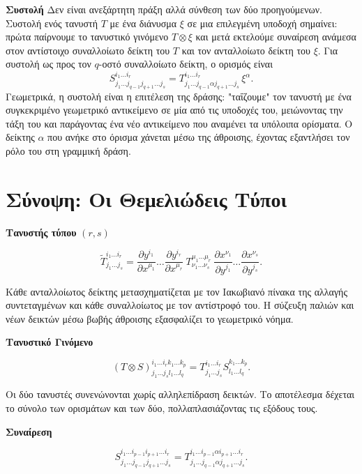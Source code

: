 \documentclass[12pt]{article}
\begin{document}
\textbf{Συστολή}  
Δεν είναι ανεξάρτητη πράξη αλλά σύνθεση των δύο προηγούμενων. Συστολή ενός τανυστή \( T \) με ένα διάνυσμα \( \xi \) σε μια επιλεγμένη υποδοχή σημαίνει: πρώτα παίρνουμε το τανυστικό γινόμενο \( T \otimes \xi \) και μετά εκτελούμε συναίρεση ανάμεσα στον αντίστοιχο συναλλοίωτο δείκτη του \( T \) και τον ανταλλοίωτο δείκτη του \( \xi \). Για συστολή ως προς τον \( q \)-οστό συναλλοίωτο δείκτη, ο ορισμός είναι
\[
S^{i_1 \dots i_r}_{j_1 \dots j_{q-1} j_{q+1} \dots j_s} = T^{i_1 \dots i_r}_{j_1 \dots j_{q-1} \alpha j_{q+1} \dots j_s} \, \xi^\alpha. \tag{13}
\]
Γεωμετρικά, η συστολή είναι η επιτέλεση της δράσης: "ταΐζουμε" τον τανυστή με ένα συγκεκριμένο γεωμετρικό αντικείμενο σε μία από τις υποδοχές του, μειώνοντας την τάξη του και παράγοντας ένα νέο αντικείμενο που αναμένει τα υπόλοιπα ορίσματα. Ο δείκτης \( \alpha \) που ανήκε στο όρισμα χάνεται μέσω της άθροισης, έχοντας εξαντλήσει τον ρόλο του στη γραμμική δράση.

\section{Σύνοψη: Οι Θεμελιώδεις Τύποι}

\textbf{Τανυστής τύπου} \( (r, s) \)

\[
\tilde{T}^{i_1 \dots i_r}_{j_1 \dots j_s} = \frac{\partial y^{i_1}}{\partial x^{\mu_1}} \dots \frac{\partial y^{i_r}}{\partial x^{\mu_r}} \ T^{\mu_1 \dots \mu_r}_{\nu_1 \dots \nu_s} \ \frac{\partial x^{\nu_1}}{\partial y^{j_1}} \dots \frac{\partial x^{\nu_s}}{\partial y^{j_s}}. \tag{10}
\]

Κάθε ανταλλοίωτος δείκτης μετασχηματίζεται με τον Ιακωβιανό πίνακα της αλλαγής συντεταγμένων και κάθε συναλλοίωτος με τον αντίστροφό του. Η σύζευξη παλιών και νέων δεικτών μέσω βωβής άθροισης εξασφαλίζει το γεωμετρικό νόημα.

\textbf{Τανυστικό Γινόμενο}

\[
(T \otimes S)^{i_1 \dots i_r k_1 \dots k_p}_{j_1 \dots j_s l_1 \dots l_q} = T^{i_1 \dots i_r}_{j_1 \dots j_s} S^{k_1 \dots k_p}_{l_1 \dots l_q}. \tag{11}
\]

Οι δύο τανυστές συνενώνονται χωρίς αλληλεπίδραση δεικτών. Το αποτέλεσμα δέχεται το σύνολο των ορισμάτων και των δύο, πολλαπλασιάζοντας τις εξόδους τους.

\textbf{Συναίρεση}

\[
S^{i_1 \dots i_{p-1} i_{p+1} \dots i_r}_{j_1 \dots j_{q-1} j_{q+1} \dots j_s} = T^{i_1 \dots i_{p-1} \alpha i_{p+1} \dots i_r}_{j_1 \dots j_{q-1} \alpha j_{q+1} \dots j_s}. \tag{12}
\]
\end{document}
